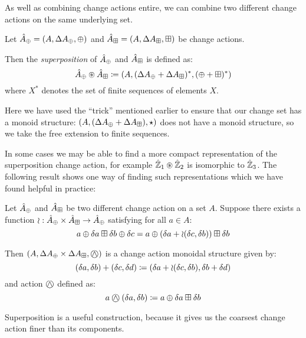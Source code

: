 As well as combining change actions entire, we can combine two different
change actions on the same underlying set.

\begin{defn}[Superposition]
  Let $\hat{A}_\oplus = (A,\Delta A_\oplus,\oplus)$ and $\hat{A}_\boxplus =
  (A,\Delta A_\boxplus,\boxplus)$ be change actions.

  Then the \textit{superposition} of $\hat{A}_\oplus$ and $\hat{A}_\boxplus$ is defined as:
  $$\hat{A}_\oplus \circledast \hat{A}_\boxplus \coloneqq (A,
    (\Delta A_\oplus + \Delta A_\boxplus)^\ast,(\oplus + \boxplus)^\ast)$$
  where $X^\ast$ denotes the set of finite sequences of elements $X$.
\end{defn}

Here we have used the ``trick'' mentioned earlier to ensure that our change
set has a monoid structure: $(A,(\Delta A_\oplus +
  \Delta A_\boxplus),\star)$ does not have a monoid structure, so we take
the free extension to finite sequences.

In some cases we may be able to find a more compact representation of the
superposition change action, for example $\hat{\mathbb{Z}}_1 \circledast \hat{\mathbb{Z}}_2$ is 
isomorphic to $\hat{\mathbb{Z}}_3$. The following result shows one way of finding such representations which
we have found helpful in practice:

\begin{prop}
  Let $\hat{A}_\oplus$ and $\hat{A}_\boxplus$ be two different change action on
  a set $A$. Suppose there exists a function
  $\wr : \hat{A}_\oplus \times \hat{A}_\boxplus \rightarrow \hat{A}_\oplus$ satisfying for
  all $a \in A$:
  $$
    a \oplus \delta a \boxplus \delta b \oplus \delta c
    = a \oplus (\delta a + \wr(\delta c,\delta b)) \boxplus \delta b
  $$

  Then $\cstruct{A}{\changes{A}_\cplus \times \changes{A}_\cpluss}{\cplussym{\wedge}}$
  is a change action monoidal structure given by:
  $$
    (\delta a, \delta b) + (\delta c, \delta d) \coloneqq 
    (\delta a + \wr(\delta c, \delta b), \delta b + \delta d)
  $$
  and action $\cplussym{\wedge}$ defined as:
  $$
    a \cplussym{\wedge} (\change{a}, \change{b}) \defeq a \cplus \change{a} \cpluss \change{b}
  $$
\end{prop}

Superposition is a useful construction, because it gives us the coarsest
change action finer than its components.

